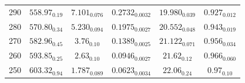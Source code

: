 \documentclass[journal=jctc,manuscript=article]{achemso}
\begin{document}
\begin{table}[htb!]
\begin{center}
\begin{tabular}{|c|c|c|c|c|c|}
			290 & $558.97_{0.19}$ & $7.101_{0.076}$ & $0.2732_{0.0032}$ & $19.980_{0.039}$ & $0.927_{0.012}$ \\
			280 & $570.80_{0.34}$ & $5.230_{0.094}$ & $0.1975_{0.0027}$ & $20.552_{0.048}$ & $0.943_{0.019}$ \\
			270 & $582.96_{0.45}$ & $3.76_{0.10}$ & $0.1389_{0.0025}$ & $21.122_{0.071}$ & $0.956_{0.034}$ \\
			260 & $593.85_{0.25}$ & $2.63_{0.10}$ & $0.0946_{0.0027}$ & $21.62_{0.12}$ & $0.966_{0.060}$ \\
			250 & $603.32_{0.94}$ & $1.787_{0.089}$ & $0.0623_{0.0034}$ & $22.06_{0.24}$ & $0.97_{0.10}$ \\
			\hline
		\end{tabular}
	\end{center}
\end{table}
\end{document}
